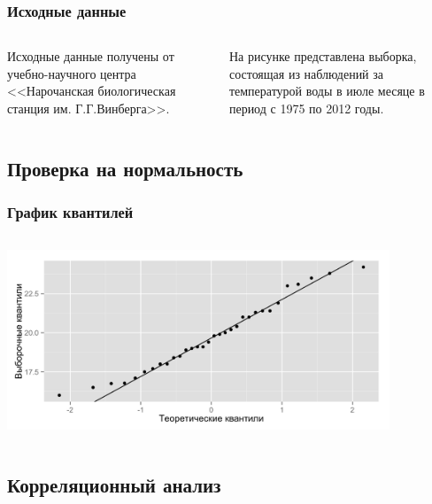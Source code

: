 \documentclass[10pt, ucs, pdf,aspectratio=169]{beamer}
\begin{document}
\begin{frame}
  \frametitle{Исходные данные}   %
  \begin{columns}[c]
  \column{2in}  %
  Исходные данные получены от учебно-научного центра <<Нарочанская биологическая станция им. Г.Г.Винберга>>.

  На рисунке представлена выборка, состоящая из наблюдений за температурой воды в июле месяце в период с 1975 по 2012 годы.
  \column{3in}
  \end{columns}
\end{frame}

\subsection{Проверка на нормальность}

\begin{frame}
  \frametitle{График квантилей}   %
   \begin{columns}[c]
   \column{4.5in}
  \includegraphics[width=4.5in]{../../figures/original/quantile.png}
  \end{columns}
\end{frame}

\subsection{Корреляционный анализ}
\end{document}

